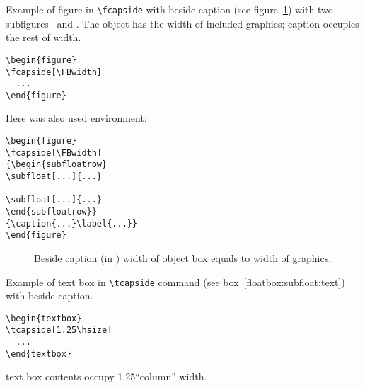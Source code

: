 \fi

\ifTwocolumn\else

\clearpage

\ifLoadSubfig

Example of figure in \verb|\fcapside| with beside caption (see figure~\ref{floatbox:beside:fig})
with two subfigures~ and . The object has the width of included graphics;
caption occupies the rest of width.
\begin{verbatim}
\begin{figure}
\fcapside[\FBwidth]
  ...
\end{figure}
\end{verbatim}
Here was also used  environment:
\begin{verbatim}
\begin{figure}
\fcapside[\FBwidth]
{\begin{subfloatrow}
\subfloat[...]{...}

\subfloat[...]{...}
\end{subfloatrow}}
{\caption{...}\label{...}}
\end{figure}
\end{verbatim}

\begin{figure}
{\caption{Beside caption (in \protect{}) width of object box equals to width of
graphics. \text}%
\label{floatbox:beside:fig}}
\end{figure}

\Text

\fi

\clearpage
Example of text box in \verb|\tcapside| command (see box~\ref{floatbox:subfloat:text}) with beside caption.
\begin{verbatim}
\begin{textbox}
\tcapside[1.25\hsize]
  ...
\end{textbox}
\end{verbatim}
text box contents occupy 1.25``column'' width.

\begin{textbox}
\tcapside[1.25\hsize]
{\TEXTBOX}
{\caption{Beside caption  (in \protect{}). The width of object equals
to 1.25``column'' width. \text}%
\label{floatbox:beside:text}}
\end{textbox}


